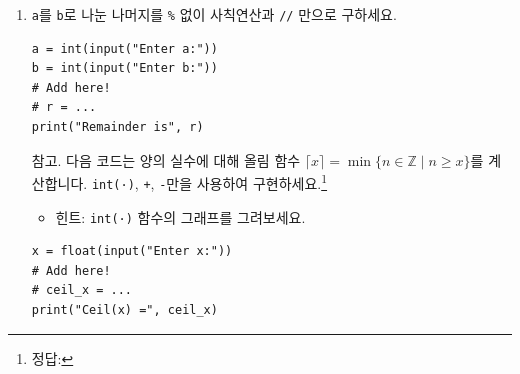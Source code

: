 \documentclass[../main.tex]{subfiles}
\begin{document}
\begin{enumerate}
  \item \verb|a|를 \verb|b|로 나눈 나머지를 \verb|%| 없이 사칙연산과 \verb|//|
  만으로 구하세요.
    \begin{verbatim}
a = int(input("Enter a:"))
b = int(input("Enter b:"))
# Add here!
# r = ...
print("Remainder is", r)
    \end{verbatim}

  \item[참고.] 다음 코드는 양의 실수에 대해 올림 함수 $\lceil x \rceil = \min
    \{n \in \mathbb{Z} \mid n \geq x\}$를 계산합니다.
    \verb|int(·)|, \verb|+|, \verb|-|만을 사용하여 구현하세요.\footnote{정답:
    }
    \begin{itemize}
      \item 힌트: \verb|int(·)| 함수의 그래프를 그려보세요.
    \end{itemize}
    \begin{verbatim}
x = float(input("Enter x:"))
# Add here!
# ceil_x = ...
print("Ceil(x) =", ceil_x)
    \end{verbatim}
\end{enumerate}
\end{document}
